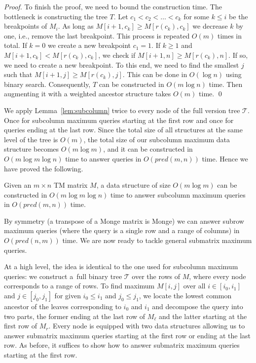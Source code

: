 \documentclass{llncs}
\newcommand{\pred}[1]{pred(#1)}
\begin{document}
\begin{proof}
To finish the proof, we need to bound the construction time. The bottleneck is constructing
the tree $T$. Let $c_{1}< c_{2}<\ldots <c_{k}$ for some $k\le i$ be the breakpoints of $M_{i}$. As long as
$M[i+1,c_{k}]\geq M[r(c_{k}),c_{k}]$ we decrease $k$ by one, i.e., remove the last breakpoint.
This process is repeated $O(m)$ times in total. If $k=0$ we create a new breakpoint
$c_{1}=1$. 
If $k\geq 1$ and  $M[i+1,c_{k}] <M[r(c_{k}),c_{k}]$, we check if $M[i+1,n] \geq M[r(c_{k}),n]$.
If so, we need to create a new breakpoint. To this end, we need to find the smallest $j$ such
that $M[i+1,j] \geq M[r(c_{k}),j]$. This can be done in
$O(\log n)$ using binary search. Consequently, $T$ can be constructed in $O(m\log n)$ time. Then augmenting
it with a weighted ancestor structure takes $O(m)$ time.
\qed \end{proof}

We apply Lemma~\ref{lem:subcolumn} twice to every node of the full version tree $\mathcal T$.
Once for subcolumn maximum queries starting at the first row and once for queries ending at the last row. Since the total
size of all structures at the same level of the tree is $O(m)$, the total size of our subcolumn
maximum data structure becomes $O(m\log m)$, and it can be constructed in $O(m\log m\log n)$
time to answer queries in $O(\pred{m,n})$ time. Hence we have proved
the following.

\begin{theorem}
\label{thm:subcolumn}
Given an $m\times n$ TM matrix $M$, a data structure of size $O(m\log m)$ can be constructed
in $O(m\log m\log n)$ time to answer subcolumn maximum queries in $O(\pred{m,n})$ time.
\end{theorem}

By symmetry (a transpose of a Monge matrix is Monge) we can answer subrow maximum
queries (where the query is a single row and a range of columns) in
$O(\pred{n,m})$ time. We are now ready to
tackle general submatrix maximum queries.


At a high level, the idea is identical to the one used for subcolumn maximum queries: we construct
a~full binary tree $\mathcal T$ over the rows of $M$, where every node corresponds to a range of rows. To
find maximum $M[i,j]$ over all $i\in [i_{0},i_{1}]$ and
$j\in [j_{0},j_{1}]$ for given $i_{0}\leq i_{1}$ and $j_{0}\leq j_{1}$, we locate the lowest
common ancestor of the leaves corresponding to $i_{0}$ and $i_{1}$ and decompose
the query into two parts, the former ending at the last row of $M_{\ell}$ and the latter
starting at the first row of $M_{r}$. Every node is equipped with two data structures
allowing us to answer submatrix maximum queries starting at the first row or ending
at the last row. As before, it suffices to show how to answer submatrix maximum queries starting
at the first row.
\end{document}
